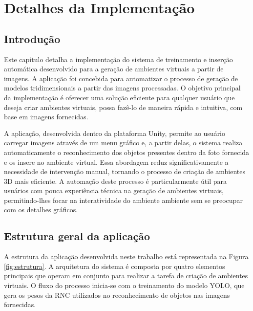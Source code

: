 \chapter{Detalhes da Implementação}

\section{Introdução}
\label{sec:Detalhes da Implementação}

Este capítulo detalha a implementação do sistema de treinamento e inserção automática desenvolvido para a geração de ambientes virtuais a partir de imagens. A aplicação foi concebida para automatizar o processo de geração de modelos tridimensionais a partir das imagens processadas. O objetivo principal da implementação é oferecer uma solução eficiente para qualquer usuário que deseja criar ambientes virtuais, possa fazê-lo de maneira rápida e intuitiva, com base em imagens fornecidas.

A aplicação, desenvolvida dentro da plataforma Unity, permite ao usuário carregar imagens através de um menu gráfico e, a partir delas, o sistema realiza automaticamente o reconhecimento dos objetos presentes dentro da foto fornecida e os insere no ambiente virtual. Essa abordagem reduz significativamente a necessidade de intervenção manual, tornando o processo de criação de ambientes 3D mais eficiente. A automação deste processo é particularmente útil para usuários com pouca experiência técnica na geração de ambientes virtuais, permitindo-lhes focar na interatividade do ambiente ambiente sem se preocupar com os detalhes gráficos.


\section{Estrutura geral da aplicação}

A estrutura da aplicação desenvolvida neste trabalho está representada na Figura \ref{fig:estrutura}. A arquitetura do sistema é composta por quatro elementos principais que operam em conjunto para realizar a tarefa de criação de ambientes virtuais. O fluxo do processo inicia-se com o treinamento do modelo YOLO, que gera os pesos da RNC utilizados no reconhecimento de objetos nas imagens fornecidas.

